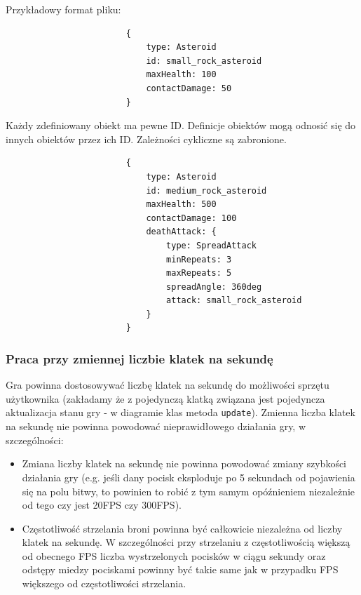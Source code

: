 \documentclass{article}
\begin{document}
				Przykładowy format pliku:\\
				\begin{minipage}{0.5\linewidth}
					\begin{verbatim}
						{
						    type: Asteroid
						    id: small_rock_asteroid
						    maxHealth: 100
						    contactDamage: 50
						}
					\end{verbatim}
				
					Każdy zdefiniowany obiekt ma pewne ID. Definicje obiektów mogą odnosić się do innych obiektów przez ich ID. Zależności cykliczne są zabronione.
				\end{minipage}
				\begin{minipage}{0.5\linewidth}
					\begin{verbatim}
						{
						    type: Asteroid
						    id: medium_rock_asteroid
						    maxHealth: 500
						    contactDamage: 100
						    deathAttack: {
						        type: SpreadAttack
						        minRepeats: 3
						        maxRepeats: 5
						        spreadAngle: 360deg
						        attack: small_rock_asteroid
						    }
						}
					\end{verbatim}
				\end{minipage}

			
			\subsubsection{Praca przy zmiennej liczbie klatek na sekundę}
				
				Gra powinna dostosowywać liczbę klatek na sekundę do możliwości sprzętu użytkownika (zakładamy że z pojedynczą klatką związana jest pojedyncza aktualizacja stanu gry - w diagramie klas metoda \verb|update|). Zmienna liczba klatek na sekundę nie powinna powodować nieprawidłowego działania gry, w szczególności:
				\begin{itemize}
					\item Zmiana liczby klatek na sekundę nie powinna powodować zmiany szybkości działania gry (e.g. jeśli dany pocisk eksploduje po 5 sekundach od pojawienia się na polu bitwy, to powinien to robić z tym samym opóźnieniem niezależnie od tego czy jest 20FPS czy 300FPS).
					\item Częstotliwość strzelania broni powinna być całkowicie niezależna od liczby klatek na sekundę. W szczególności przy strzelaniu z częstotliwością większą od obecnego FPS liczba wystrzelonych pocisków w ciągu sekundy oraz odstępy miedzy pociskami powinny być takie same jak w przypadku FPS większego od częstotliwości strzelania.
				\end{itemize}
			
\end{document}

